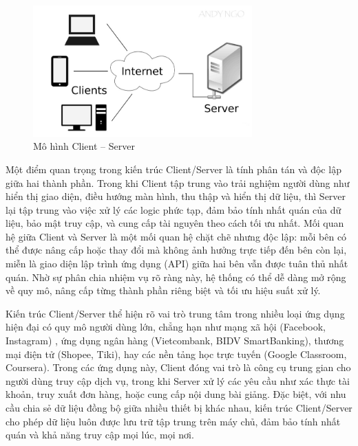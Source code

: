 \begin{figure}[h]
  \centering
  \includegraphics[width=0.75\textwidth]{images/client-server.jpg}
  \caption{Mô hình Client – Server}
  \label{fig:fig14}
\end{figure}

    \begin{flushleft}
      \hspace*{0.8cm}Một điểm quan trọng trong kiến trúc Client/Server là tính phân tán và độc lập giữa hai thành phần. Trong khi Client tập trung vào trải nghiệm người dùng như hiển thị giao diện, điều hướng màn hình, thu thập và hiển thị dữ liệu, thì Server lại tập trung vào việc xử lý các logic phức tạp, đảm bảo tính nhất quán của dữ liệu, bảo mật truy cập, và cung cấp tài nguyên theo cách tối ưu nhất. Mối quan hệ giữa Client và Server là một mối quan hệ chặt chẽ nhưng độc lập: mỗi bên có thể được nâng cấp hoặc thay đổi mà không ảnh hưởng trực tiếp đến bên còn lại, miễn là giao diện lập trình ứng dụng (API) giữa hai bên vẫn được tuân thủ nhất quán. Nhờ sự phân chia nhiệm vụ rõ ràng này, hệ thống có thể dễ dàng mở rộng về quy mô, nâng cấp từng thành phần riêng biệt và tối ưu hiệu suất xử lý.
    \end{flushleft}

    \begin{flushleft}
      \hspace*{0.8cm}Kiến trúc Client/Server thể hiện rõ vai trò trung tâm trong nhiều loại ứng dụng hiện đại có quy mô người dùng lớn, chẳng hạn như mạng xã hội (Facebook, Instagram) \cite{social-apps}, ứng dụng ngân hàng (Vietcombank, BIDV SmartBanking), thương mại điện tử (Shopee, Tiki), hay các nền tảng học trực tuyến (Google Classroom, Coursera). Trong các ứng dụng này, Client đóng vai trò là công cụ trung gian cho người dùng truy cập dịch vụ, trong khi Server xử lý các yêu cầu như xác thực tài khoản, truy xuất đơn hàng, hoặc cung cấp nội dung bài giảng. Đặc biệt, với nhu cầu chia sẻ dữ liệu đồng bộ giữa nhiều thiết bị khác nhau, kiến trúc Client/Server cho phép dữ liệu luôn được lưu trữ tập trung trên máy chủ, đảm bảo tính nhất quán và khả năng truy cập mọi lúc, mọi nơi.
    \end{flushleft}

